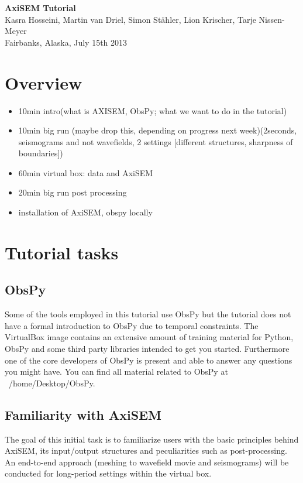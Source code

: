 \documentclass{article}
\begin{document}
\begin{center}
\title{}
\LARGE{ \textbf{\sc AxiSEM Tutorial}}
\vspace*{0.1cm}\\
{\large 
Kasra Hosseini, Martin van Driel, Simon St\"{a}hler, 
Lion Krischer, Tarje Nissen-Meyer \\
{Fairbanks, Alaska, July 15th 2013}
}
\end{center}

\section{Overview}
\baselineskip=13pt
%
\begin{itemize}
\item 10min intro(what is AXISEM, ObsPy; what we want to do in the tutorial)
\item 10min big run (maybe drop this, depending on progress next week)(2seconds, seismograms 
and not wavefields, 2 settings [different structures, sharpness of boundaries])
\item  60min virtual box: data and AxiSEM
\item  20min big run post processing
\item installation of AxiSEM, obspy locally
\end{itemize}
%
\section{Tutorial tasks}
%
\subsection{ObsPy}
Some of the tools employed in this tutorial use ObsPy but the tutorial
does not have a formal introduction to ObsPy due to temporal
constraints. The VirtualBox image contains an extensive amount of
training material for Python, ObsPy and some third party libraries
intended to get you started. Furthermore one of the core developers of
ObsPy is present and able to answer any questions you might have. You
can find all material related to ObsPy at ~/home/Desktop/ObsPy.
%
\subsection{Familiarity with AxiSEM}
The goal of this initial task is to familiarize users with the basic
principles behind AxiSEM, its input/output structures and
peculiarities such as post-processing. An end-to-end approach (meshing to
wavefield movie and seismograms) will be conducted for long-period
settings within the virtual box.
%
\end{document}
